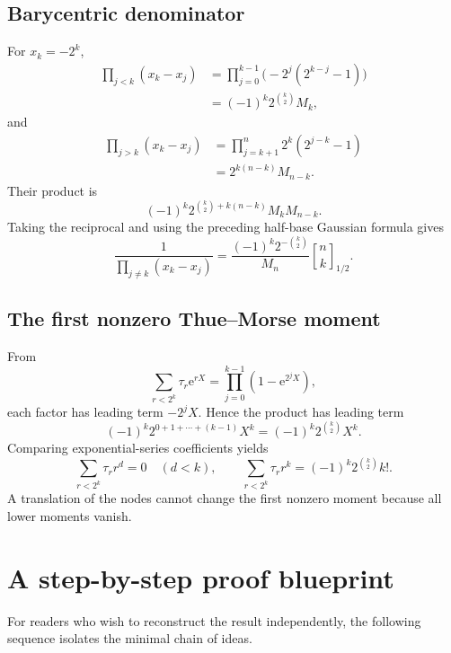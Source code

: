 \documentclass[11pt,oneside]{article}
\theoremstyle{definition}
\theoremstyle{remark}
\newcommand{\halfqbinom}[2]{{\genfrac{[}{]}{0pt}{}{#1}{#2}}_{1/2}}
\newcommand{\e}{\mathrm e}
\newcommand{\tm}{\tau}
\begin{document}
\subsection{Barycentric denominator}

For $x_k=-2^k$,
\begin{align*}
 \prod_{j<k}(x_k-x_j)
 &=\prod_{j=0}^{k-1}\bigl(-2^j(2^{k-j}-1)\bigr)\\
 &=(-1)^k2^{\binom{k}{2}}M_k,
\end{align*}
and
\begin{align*}
 \prod_{j>k}(x_k-x_j)
 &=\prod_{j=k+1}^{n}2^k(2^{j-k}-1)\\
 &=2^{k(n-k)}M_{n-k}.
\end{align*}
Their product is
\[
 (-1)^k2^{\binom{k}{2}+k(n-k)}M_kM_{n-k}.
\]
Taking the reciprocal and using the preceding half-base Gaussian formula
gives
\[
 \frac1{\prod_{j\ne k}(x_k-x_j)}
 =\frac{(-1)^k2^{-\binom{k}{2}}}{M_n}
  \halfqbinom{n}{k}.
\]

\subsection{The first nonzero Thue--Morse moment}

From
\[
 \sum_{r<2^k}\tm_r\e^{rX}
 =\prod_{j=0}^{k-1}(1-\e^{2^jX}),
\]
each factor has leading term $-2^jX$.  Hence the product has leading term
\[
 (-1)^k2^{0+1+\cdots+(k-1)}X^k
 =(-1)^k2^{\binom{k}{2}}X^k.
\]
Comparing exponential-series coefficients yields
\[
 \sum_{r<2^k}\tm_rr^d=0\quad(d<k),
 \qquad
 \sum_{r<2^k}\tm_rr^k
 =(-1)^k2^{\binom{k}{2}}k!.
\]
A translation of the nodes cannot change the first nonzero moment because all
lower moments vanish.

\section{A step-by-step proof blueprint}

For readers who wish to reconstruct the result independently, the following
sequence isolates the minimal chain of ideas.
\end{document}
